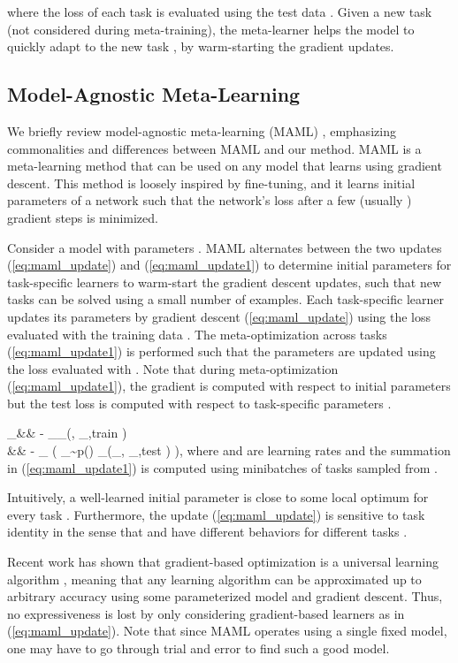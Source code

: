 \documentclass{article}
\newcommand{\calD}{{\mathcal{D}}}
\newcommand{\calT}{{\mathcal{T}}}
\newcommand{\0}{{\bf 0}}
\newcommand{\be}{}
\newcommand{\loss}{\mathcal{L}_{\calT}}
\begin{document}
where the loss of each task is evaluated using the test data .
Given a new task  (not considered during meta-training),
the meta-learner helps the model  to quickly adapt to the new task ,
by warm-starting the gradient updates.

\subsection{Model-Agnostic Meta-Learning}
We briefly review model-agnostic meta-learning (MAML) \cite{FinnC2017icml}, emphasizing commonalities and differences between MAML and our method.
MAML is a meta-learning method that can be used on any model that learns using gradient descent. 
This method is loosely inspired by fine-tuning, and it learns initial parameters of a network such that the network's loss after a few (usually ) gradient steps is minimized.

Consider a model with parameters .
MAML alternates between the two updates (\ref{eq:maml_update}) and (\ref{eq:maml_update1})
to determine initial parameters  
for task-specific learners to warm-start the gradient descent updates,
such that new tasks can be solved using a small number of examples.
Each task-specific learner updates its parameters by gradient descent (\ref{eq:maml_update}) 
using the loss evaluated with the training data . 
The meta-optimization across tasks (\ref{eq:maml_update1}) is performed such that the parameters  are updated
using the loss evaluated with .
Note that during meta-optimization (\ref{eq:maml_update1}), the gradient is computed with respect to initial parameters  but the test loss is computed with respect to task-specific parameters .

\be
\label{eq:maml_update}
\widetilde{\theta}_\calT &\leftarrow& \theta - \alpha \nabla_\theta \loss \left(\theta, \calD_{\calT,train} \right) \\
\theta &\leftarrow& \theta - \beta \nabla_{\theta}
\label{eq:maml_update1}
\left( \sum_{\calT \sim p(\calT)} \loss \left(\widetilde{\theta}_{\calT}, \calD_{\calT,test} \right) \right),
\ee
where  and  are learning rates and 
the summation in (\ref{eq:maml_update1}) is computed using minibatches of tasks sampled from .

Intuitively, a well-learned initial parameter  is close to some local optimum for every task .
Furthermore, the update (\ref{eq:maml_update}) is sensitive to task identity in the sense that  and 
have different behaviors for different tasks .

Recent work has shown that gradient-based optimization is a universal learning algorithm \cite{FinnC2017arxiv}, 
meaning that any learning algorithm can be approximated up to arbitrary accuracy using some parameterized model and gradient descent.
Thus, no expressiveness is lost by only considering gradient-based learners as in (\ref{eq:maml_update}). 
Note that since MAML operates using a single fixed model, one may have to go through trial and error to find such a good model.
\end{document}
